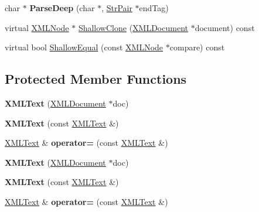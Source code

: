 \begin{DoxyCompactItemize}
\mbox{\label{classtinyxml2_1_1XMLText_a29f626cc5bf9d536e21fe033ecd5994a}} 
char $\ast$ {\bfseries Parse\+Deep} (char $\ast$, \hyperlink{classtinyxml2_1_1StrPair}{Str\+Pair} $\ast$end\+Tag)
\item 
virtual \hyperlink{classtinyxml2_1_1XMLNode}{X\+M\+L\+Node} $\ast$ \hyperlink{classtinyxml2_1_1XMLText_af3a81ed4dd49d5151c477b3f265a3011}{Shallow\+Clone} (\hyperlink{classtinyxml2_1_1XMLDocument}{X\+M\+L\+Document} $\ast$document) const
\item 
virtual bool \hyperlink{classtinyxml2_1_1XMLText_ae0fff8a24e2de7eb073fd192e9db0331}{Shallow\+Equal} (const \hyperlink{classtinyxml2_1_1XMLNode}{X\+M\+L\+Node} $\ast$compare) const
\end{DoxyCompactItemize}
\subsection*{Protected Member Functions}
\begin{DoxyCompactItemize}
\item 
\mbox{\label{classtinyxml2_1_1XMLText_ad9f46d70e61e5386ead93728d8b90267}} 
{\bfseries X\+M\+L\+Text} (\hyperlink{classtinyxml2_1_1XMLDocument}{X\+M\+L\+Document} $\ast$doc)
\item 
\mbox{\label{classtinyxml2_1_1XMLText_a002156e1f61ee6d48e5368b7cca25582}} 
{\bfseries X\+M\+L\+Text} (const \hyperlink{classtinyxml2_1_1XMLText}{X\+M\+L\+Text} \&)
\item 
\mbox{\label{classtinyxml2_1_1XMLText_ad8c9f398d92fa472e213b89d8483ae8f}} 
\hyperlink{classtinyxml2_1_1XMLText}{X\+M\+L\+Text} \& {\bfseries operator=} (const \hyperlink{classtinyxml2_1_1XMLText}{X\+M\+L\+Text} \&)
\item 
\mbox{\label{classtinyxml2_1_1XMLText_ad9f46d70e61e5386ead93728d8b90267}} 
{\bfseries X\+M\+L\+Text} (\hyperlink{classtinyxml2_1_1XMLDocument}{X\+M\+L\+Document} $\ast$doc)
\item 
\mbox{\label{classtinyxml2_1_1XMLText_a002156e1f61ee6d48e5368b7cca25582}} 
{\bfseries X\+M\+L\+Text} (const \hyperlink{classtinyxml2_1_1XMLText}{X\+M\+L\+Text} \&)
\item 
\mbox{\label{classtinyxml2_1_1XMLText_ad8c9f398d92fa472e213b89d8483ae8f}} 
\hyperlink{classtinyxml2_1_1XMLText}{X\+M\+L\+Text} \& {\bfseries operator=} (const \hyperlink{classtinyxml2_1_1XMLText}{X\+M\+L\+Text} \&)
\end{DoxyCompactItemize}

